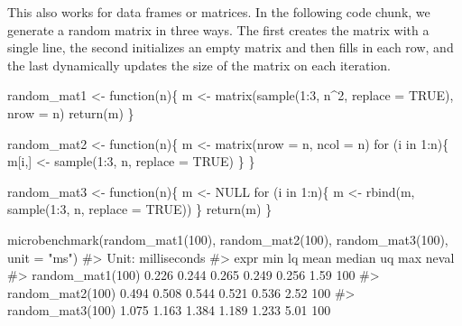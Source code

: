 \documentclass[
  letterpaper,
]{latex/krantz}
\makeatletter
\newenvironment{Shaded}{\begin{snugshade}}{\end{snugshade}}
\newcommand{\AttributeTok}[1]{\textcolor[rgb]{0.40,0.45,0.13}{#1}}
\newcommand{\CommentTok}[1]{\textcolor[rgb]{0.37,0.37,0.37}{#1}}
\newcommand{\ConstantTok}[1]{\textcolor[rgb]{0.56,0.35,0.01}{#1}}
\newcommand{\ControlFlowTok}[1]{\textcolor[rgb]{0.00,0.23,0.31}{#1}}
\newcommand{\DecValTok}[1]{\textcolor[rgb]{0.68,0.00,0.00}{#1}}
\newcommand{\FunctionTok}[1]{\textcolor[rgb]{0.28,0.35,0.67}{#1}}
\newcommand{\NormalTok}[1]{\textcolor[rgb]{0.00,0.23,0.31}{#1}}
\newcommand{\OtherTok}[1]{\textcolor[rgb]{0.00,0.23,0.31}{#1}}
\newcommand{\SpecialCharTok}[1]{\textcolor[rgb]{0.37,0.37,0.37}{#1}}
\newcommand{\StringTok}[1]{\textcolor[rgb]{0.13,0.47,0.30}{#1}}
\newenvironment{kframe}{%
\medskip{}
\setlength{\fboxsep}{.8em}
 \def\at@end@of@kframe{}%
 \ifinner\ifhmode%
  \def\at@end@of@kframe{\end{minipage}}%
  \begin{minipage}{\columnwidth}%
 \fi\fi%
 \def\FrameCommand##1{\hskip\@totalleftmargin \hskip-\fboxsep
 \colorbox{shadecolor}{##1}\hskip-\fboxsep
     \hskip-\linewidth \hskip-\@totalleftmargin \hskip\columnwidth}%
 \MakeFramed {\advance\hsize-\width
   \@totalleftmargin\z@ \linewidth\hsize
   \@setminipage}}%
 {\par\unskip\endMakeFramed%
 \at@end@of@kframe}
\renewenvironment{Shaded}{\begin{kframe}}{\end{kframe}}
\makeatother
\begin{document}
This also works for data frames or matrices. In the following code
chunk, we generate a random matrix in three ways. The first creates the
matrix with a single line, the second initializes an empty matrix and
then fills in each row, and the last dynamically updates the size of the
matrix on each iteration.

\begin{Shaded}
\begin{Highlighting}[]
\NormalTok{random\_mat1 }\OtherTok{\textless{}{-}} \ControlFlowTok{function}\NormalTok{(n)\{}
\NormalTok{  m }\OtherTok{\textless{}{-}} \FunctionTok{matrix}\NormalTok{(}\FunctionTok{sample}\NormalTok{(}\DecValTok{1}\SpecialCharTok{:}\DecValTok{3}\NormalTok{, n}\SpecialCharTok{\^{}}\DecValTok{2}\NormalTok{, }\AttributeTok{replace =} \ConstantTok{TRUE}\NormalTok{), }\AttributeTok{nrow =}\NormalTok{ n)}
  \FunctionTok{return}\NormalTok{(m)}
\NormalTok{\}}

\NormalTok{random\_mat2 }\OtherTok{\textless{}{-}} \ControlFlowTok{function}\NormalTok{(n)\{}
\NormalTok{  m }\OtherTok{\textless{}{-}} \FunctionTok{matrix}\NormalTok{(}\AttributeTok{nrow =}\NormalTok{ n, }\AttributeTok{ncol =}\NormalTok{ n)}
  \ControlFlowTok{for}\NormalTok{ (i }\ControlFlowTok{in} \DecValTok{1}\SpecialCharTok{:}\NormalTok{n)\{}
\NormalTok{    m[i,] }\OtherTok{\textless{}{-}} \FunctionTok{sample}\NormalTok{(}\DecValTok{1}\SpecialCharTok{:}\DecValTok{3}\NormalTok{, n, }\AttributeTok{replace =} \ConstantTok{TRUE}\NormalTok{)}
\NormalTok{  \}}
\NormalTok{\}}

\NormalTok{random\_mat3 }\OtherTok{\textless{}{-}} \ControlFlowTok{function}\NormalTok{(n)\{}
\NormalTok{  m }\OtherTok{\textless{}{-}} \ConstantTok{NULL}
  \ControlFlowTok{for}\NormalTok{ (i }\ControlFlowTok{in} \DecValTok{1}\SpecialCharTok{:}\NormalTok{n)\{}
\NormalTok{    m }\OtherTok{\textless{}{-}} \FunctionTok{rbind}\NormalTok{(m, }\FunctionTok{sample}\NormalTok{(}\DecValTok{1}\SpecialCharTok{:}\DecValTok{3}\NormalTok{, n, }\AttributeTok{replace =} \ConstantTok{TRUE}\NormalTok{))}
\NormalTok{  \}}
  \FunctionTok{return}\NormalTok{(m)}
\NormalTok{\}}

\FunctionTok{microbenchmark}\NormalTok{(}\FunctionTok{random\_mat1}\NormalTok{(}\DecValTok{100}\NormalTok{),}
               \FunctionTok{random\_mat2}\NormalTok{(}\DecValTok{100}\NormalTok{),}
               \FunctionTok{random\_mat3}\NormalTok{(}\DecValTok{100}\NormalTok{),}
               \AttributeTok{unit =} \StringTok{"ms"}\NormalTok{)}
\CommentTok{\#\textgreater{} Unit: milliseconds}
\CommentTok{\#\textgreater{}              expr   min    lq  mean median    uq  max neval}
\CommentTok{\#\textgreater{}  random\_mat1(100) 0.226 0.244 0.265  0.249 0.256 1.59   100}
\CommentTok{\#\textgreater{}  random\_mat2(100) 0.494 0.508 0.544  0.521 0.536 2.52   100}
\CommentTok{\#\textgreater{}  random\_mat3(100) 1.075 1.163 1.384  1.189 1.233 5.01   100}
\end{Highlighting}
\end{Shaded}
\end{document}
